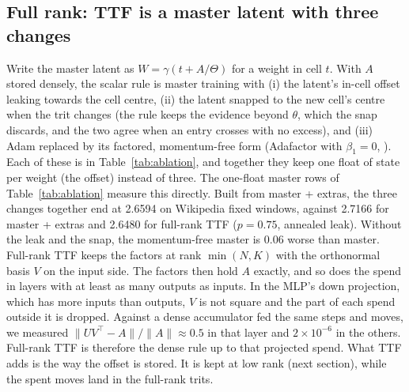 \documentclass[10pt,twocolumn]{article}
\begin{document}
\subsection{Full rank: TTF is a master latent with three changes}\label{sec:fullrank}
Write the master latent as $W=\gamma(t+A/\Theta)$ for a weight in cell $t$. With $A$ stored densely, the scalar rule is
master training with (i) the latent's in-cell offset leaking towards the cell centre, (ii) the latent snapped to the new
cell's centre when the trit changes (the rule keeps the evidence beyond $\theta$, which the snap discards, and the two agree
when an entry crosses with no excess), and (iii) Adam replaced by its factored, momentum-free form (Adafactor with
$\beta_1=0$, \citealp{shazeer2018adafactor}). Each of these is in Table~\ref{tab:ablation}, and together they keep one float
of state per weight (the offset) instead of three. The one-float master rows of Table~\ref{tab:ablation} measure this
directly. Built from master + extras, the three changes together end at 2.6594 on Wikipedia fixed windows, against
2.7166 for master + extras and 2.6480 for full-rank TTF ($p=0.75$, annealed leak). Without the leak and the snap, the
momentum-free master is 0.06 worse than master. Full-rank TTF keeps the factors at rank $\min(N,K)$ with the
orthonormal basis $V$ on the input side. The factors then hold $A$ exactly, and so does the spend in layers with at
least as many outputs as inputs. In the MLP's down projection, which has more inputs than outputs, $V$ is not square
and the part of each spend outside it is dropped. Against a dense accumulator fed the same steps and moves, we measured
$\|UV^\top-A\|/\|A\|\approx0.5$ in that layer and $2\times10^{-6}$ in the others. Full-rank TTF is therefore the dense
rule up to that projected spend. What TTF adds is the way the offset is stored. It is kept at low rank (next section),
while the spent moves land in the full-rank trits.
\end{document}
